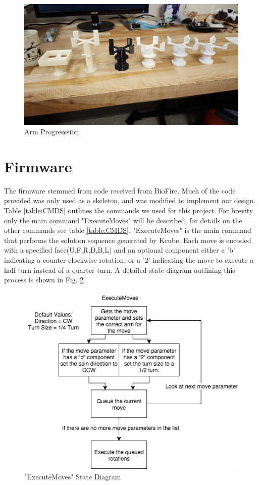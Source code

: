\documentclass[final, letterpaper, 10 pt, conference, twocolumn]{IEEEtran}
\begin{document}
\begin{figure}[!ht]
\centering
\includegraphics[width=\linewidth]{ArmProgression.jpg}
\caption{Arm Progresssion}
\label{fig:Arm Progression}
\end{figure}


\section{Firmware}
\label{sec:Firmware}
The firmware stemmed from code received from BioFire.  Much of the code provided was only used as a skeleton, and was modified to implement our design.
Table \ref{table:CMDS} outlines the commands we used for this project. For brevity only the main command "ExecuteMoves" will be described, for details on the other commands see  
table \ref{table:CMDS}.  "ExecuteMoves" is the main command that performs the solution sequence generated by Kcube.  Each move is encoded with a specified face(U,F,R,D,B,L) and an optional component either a 'b' indicating a counter-clockwise rotation, or a '2' indicating the move to execute a half turn instead of a quarter turn.  A detailed state diagram outlining this process is shown in Fig.  \ref{fig:ExecuteMoves}

\begin{figure}[!h]
\centering
\includegraphics[width=\linewidth]{ExecuteMoves.png}
\caption{"ExecuteMoves" State Diagram}
\label{fig:ExecuteMoves}
\end{figure}
\end{document}
